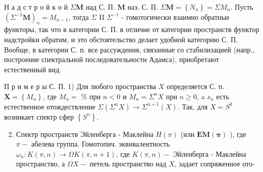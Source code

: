 \documentclass[10pt]{article}
\begin{document}
Н а д с т р о й к о й $\Sigma \boldsymbol{M}$ над С. П. $\boldsymbol{M}$ наз. С. П. $\Sigma \boldsymbol{M}=\left\{N_{n}\right\}=\Sigma M_{n}$. Пусть $\left(\Sigma^{-1} \boldsymbol{M}\right)_{n}=M_{n-1}$, тогда $\Sigma$ II $\Sigma^{-1}$ - гомотогически взаимно обратные функторы, так что в категории С. П. в отличие от категории пространств функтор надстройки обратим, и это обстоятельство делает удобной категорию С. П. Вообще, в категории С. п. все рассуждения, связанные со стабилизацией (напр., построение спектральной последовательности Адамса), приобретают естественный вид.



П р и м е р ы С. П. 1) Для любого пространства $X$ определяется С. п. $\boldsymbol{X}=\left\{M_{n}\right\}$, где $M_{n}=$ \% при $n<0$ и $M_{n}=\Sigma^{n} X$ при $n \geqslant 0$, a $s_{n}$ есть естественное отождествление $\Sigma\left(\Sigma^{n} X\right) \rightarrow \Sigma^{n+1}(X)$. Так, для $X=S^{0}$ возникает спектр сфер $\left\{S^{n}\right\}$.



\begin{enumerate}

  \setcounter{enumi}{1}

  \item Спектр пространств Эйленберга - Маклейна $H(\pi)$ (или $\boldsymbol{E} \boldsymbol{M}(\boldsymbol{\pi})$ ), где $\pi-$ абелева группа. Гомотопич. эквивалентность $\omega_{n}: K(\pi, n) \rightarrow \Omega K(\pi, n+1)$, где $K(\pi, n)-$ Эйленберга - Маклейна пространство, а $\Omega X-$ петель пространство над $X$, задает сопряженное ото-

\end{enumerate}
\end{document}
